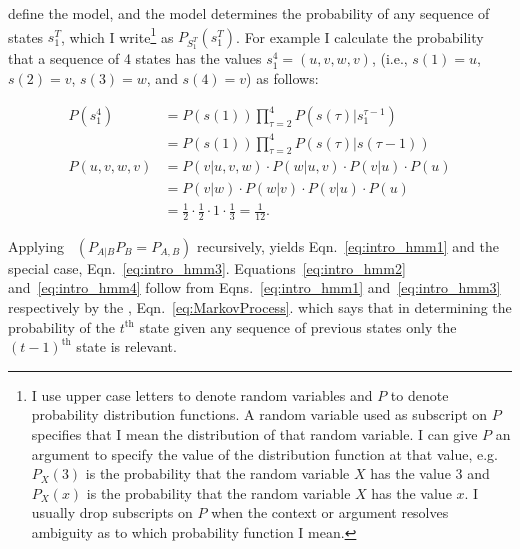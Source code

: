 \documentclass[]{article}
\newcommand{\ts}[3]{#1_{#2}^{#3}}                    %
\newcommand{\ti}[2]{{#1}{(#2)}}                  %
\newcommand{\ie}{i.e.\xspace}
\newcommand{\eg}{e.g.\xspace}
\begin{document}
define the model, and the model determines the probability of any
sequence of states $\ts{s}{1}{T}$, which I write\footnote{I use
  upper case letters to denote random variables and $P$ to denote
  probability distribution functions.  A random variable used as
  subscript on $P$ specifies that I mean the distribution of that
  random variable.  I can give $P$ an argument to specify the value
  of the distribution function at that value, \eg $P_X(3)$ is the
  probability that the random variable $X$ has the value 3 and
  $P_X(x)$ is the probability that the random variable $X$ has the
  value $x$.  I usually drop subscripts on $P$ when the context or
  argument resolves ambiguity as to which probability function I
  mean.} as $P_{\ts{S}{1}{T}}\left( \ts{s}{1}{T} \right)$.  For
example I calculate the probability that a sequence of 4 states has
the values $\ts{s}{1}{4} = (u,v,w,v)$, (\ie, $\ti{s}{1} = u$,
$\ti{s}{2} = v$, $\ti{s}{3} = w$, and $\ti{s}{4} = v$) as follows:


\begin{align}
  \label{eq:intro_hmm1}
  P(\ts{s}{1}{4}) &= P(\ti{s}{1}) \prod_{\tau=2}^4 %
                     P(\ti{s}{\tau}|\ts{s}{1}{\tau-1})\\
  \label{eq:intro_hmm2}
                  &= P(\ti{s}{1}) \prod_{\tau=2}^4 %
                     P(\ti{s}{\tau}|\ti{s}{\tau-1}) \\
  \label{eq:intro_hmm3}
  P(u,v,w,v)      &= P(v|u,v,w) \cdot P(w|u,v) \cdot  P(v|u) \cdot P(u)\\
  \label{eq:intro_hmm4}
        &= P(v|w) \cdot P(w|v) \cdot  P(v|u) \cdot P(u)\\
  \label{eq:intro_hmm5}
        &= \frac{1}{2} \cdot \frac{1}{2} \cdot 1 %
                     \cdot \frac{1}{3} = \frac{1}{12}.
\end{align}

Applying~ $\left( P_{A|B} P_B = P_{A,B} \right)$
recursively, yields Eqn.~\eqref{eq:intro_hmm1} and the special case,
Eqn.~\eqref{eq:intro_hmm3}.  Equations~\eqref{eq:intro_hmm2}
and~\eqref{eq:intro_hmm4} follow from Eqns.~\eqref{eq:intro_hmm1}
and~\eqref{eq:intro_hmm3} respectively by the %
\emph{}, Eqn.~\eqref{eq:MarkovProcess}.
which says that in determining the probability of the $t^\text{th}$
state given any sequence of previous states only the
${(t-1)}^{\text{th}}$ state is relevant. %
\end{document}
